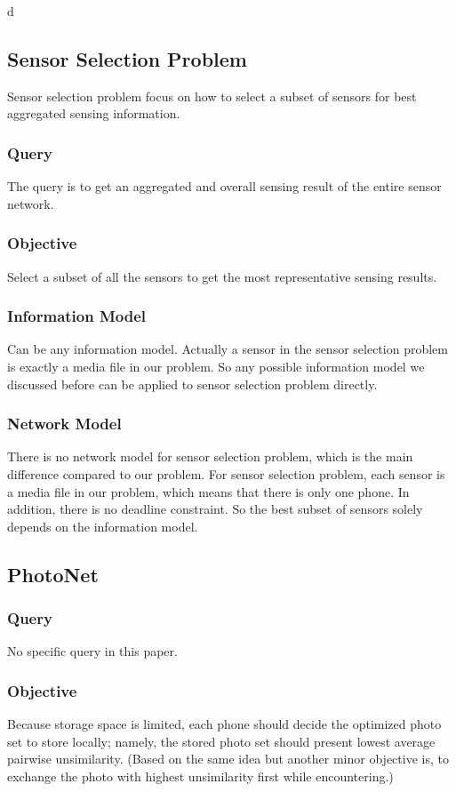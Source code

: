 d\documentclass[letterpaper]{sig-alternate-10pt}
\begin{document}
\subsection{Sensor Selection Problem}
Sensor selection problem focus on how to select a subset of sensors for best aggregated sensing information. 
\subsubsection{Query}
The query is to get an aggregated and overall sensing result of the entire sensor network.
\subsubsection{Objective}
Select a subset of all the sensors to get the most representative sensing results.
\subsubsection{Information Model}
Can be any information model. Actually a sensor in the sensor selection problem is exactly a media file in our problem. So any possible information model we discussed before can be applied to sensor selection problem directly.
\subsubsection{Network Model}
There is no network model for sensor selection problem, which is the main difference compared to our problem. For sensor selection problem, each sensor is a media file in our problem, which means that there is only one phone. In addition, there is no deadline constraint. So the best subset of sensors solely depends on the information model.

\subsection{PhotoNet}
\subsubsection{Query}
No specific query in this paper.
\subsubsection{Objective}
Because storage space is limited, each phone should decide the optimized photo set to store locally; namely, the stored photo set should present lowest average pairwise unsimilarity. (Based on the same idea but another minor objective is, to exchange the photo with highest unsimilarity first while encountering.)
\end{document}
